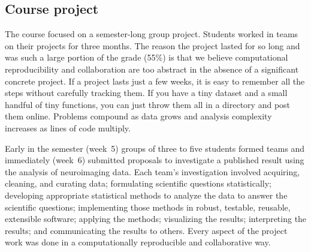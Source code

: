 \subsection{Course project}\label{project}

The course focused on a semester-long group project.
Students worked in teams on their projects for three months.
The reason the project lasted for so long and was such a large portion of the grade (55\%)
is that we believe computational reproducibility and collaboration
are too abstract in the absence of a significant concrete project.
If a project lasts just a few weeks, it is easy to remember all the steps
without carefully tracking them.
If you have a tiny dataset and a small handful of tiny functions, you can just
throw them all in a directory and post them online.
Problems compound as data grows and analysis complexity increases as lines of
code multiply.


Early in the semester (week~5) groups of three to five students formed teams
and immediately (week~6) submitted proposals to investigate
a published result using the analysis of neuroimaging data.
Each team's investigation involved
acquiring, cleaning, and curating data;
formulating scientific questions statistically;
developing appropriate statistical methods
to analyze the data to answer the scientific questions;
implementing those methods in robust, testable, reusable, extensible software;
applying the methods;
visualizing the results;
interpreting the results;
and communicating the results to others.
Every aspect of the project work was done in a computationally reproducible
and collaborative way.

